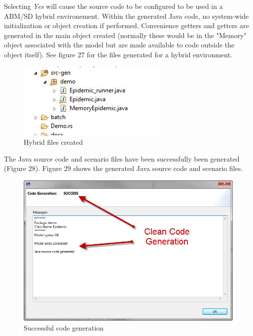 \documentclass[11pt]{amsart}
\begin{document}
 Selecting \textit{Yes} will cause the source code to be configured to be used in a ABM/SD hybrid environement. Within the generated  Java code, no system-wide initialization or object creation if performed. Convenience getters and getters are generated in the main object created (normally these would be in the "Memory" object associated with the model but are made available to code outside the object itself). See figure 27 for the files generated for a hybrid environment.

\begin{figure}[ht]
\begin{center}
\vspace{.2in}
\centerline {
\includegraphics[totalheight=0.3\textheight]{images/hybrid.jpg}
}
\caption{Hybrid files created}
\label{fig:02c}
\end{center}
\end{figure}


The Java source code and scenario files have been successfully been generated (Figure 28). Figure 29 shows the generated Java source code and scenario files.

\begin{figure}[ht]
\begin{center}
\vspace{.2in}
\centerline {
\includegraphics[totalheight=0.3\textheight]{images/026.jpg}
}
\caption{Successful code generation}
\label{fig:026}
\end{center}
\end{figure}
\end{document}
